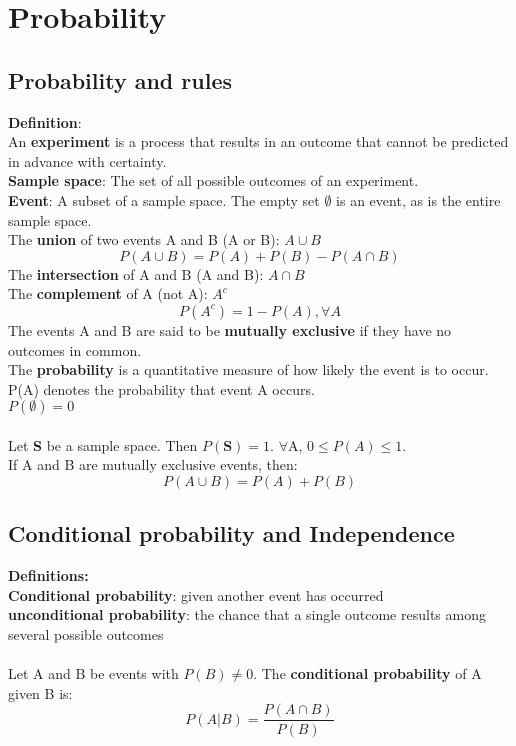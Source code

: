 \documentclass[../main.tex]{subfiles}
\begin{document}
\section{Probability}

\subsection{Probability and rules}
\textbf{Definition}:
\\
An \textbf{experiment} is a process that results in an outcome that cannot be predicted in advance with certainty.\\
\textbf{Sample space}: The set of all possible outcomes of an experiment.\\
\textbf{Event}: A subset of a sample space. The empty set $\emptyset$ is an event, as is the entire sample space.\\
The \textbf{union} of two events A and B (A or B): $A\cup B$\\
\begin{equation*}
    P(A\cup B)=P(A)+P(B)-P(A\cap B)
\end{equation*}
The \textbf{intersection} of A and B (A and B): $A\cap B$\\
The \textbf{complement} of A (not A): $A^c$
\begin{equation*}
    P(A^c)=1-P(A), \forall A
\end{equation*}
The events A and B are said to be \textbf{mutually exclusive} if they have no outcomes in common.\\
The \textbf{probability} is a quantitative measure of how likely the event is to occur.\\
P(A) denotes the probability that event A occurs.\\
$P(\emptyset) = 0$\\
\\
Let \textbf{S} be a sample space. Then $P(\textbf{S})=1$.  $\forall$A, $0\leq P(A)\leq 1$.\\
If A and B are mutually exclusive events, then:
\begin{equation*}
    P(A\cup B) = P(A)+P(B)
\end{equation*}

\subsection{Conditional probability and Independence}
\textbf{Definitions:}\\
\textbf{Conditional probability}: given another event has occurred\\
\textbf{unconditional probability}: the chance that a single outcome results among several possible outcomes\\
\\
Let A and B be events with $P(B) \neq 0$. The \textbf{conditional probability} of A given B is:
\begin{equation*}
    P(A|B)=\frac{P(A\cap B)}{P(B)}
\end{equation*}
\end{document}
